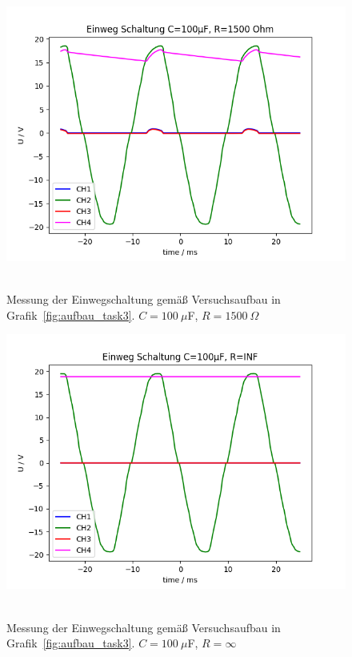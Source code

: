 \documentclass{article}
\begin{document}
\begin{figure}[H]
\caption{Messung der Einwegschaltung gemäß Versuchsaufbau in Grafik~\ref{fig:aufbau_task3}. $C=100~\mu$F, $R=1500~\Omega$}
\label{fig:grafik_task3_100_1500}
{\centering
\includegraphics[scale=0.6]{bilder/task3_100mu_R1500.png}
~
}
\end{figure}

\begin{figure}[H]
\caption{Messung der Einwegschaltung gemäß Versuchsaufbau in Grafik~\ref{fig:aufbau_task3}. $C=100~\mu$F, $R=\infty$}
\label{fig:grafik_task3_100_inf}
{\centering
\includegraphics[scale=0.6]{bilder/task3_100mu_Rinf.png}
~
}
\end{figure}
\end{document}
